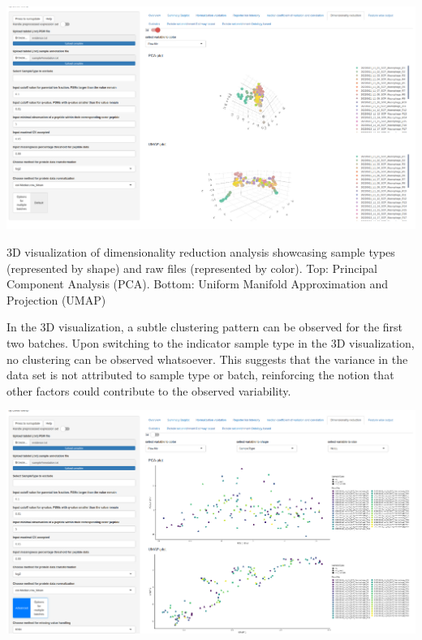 \documentclass[
  11pt,
]{article}
\let\origfigure\figure
\begin{document}
\newpage
\bgroup  \origfigure[H] 

{\centering \includegraphics[width=1\linewidth]{screenshots/dim_red_3d} 

}

\caption{3D visualization of dimensionality reduction analysis showcasing sample types (represented by shape) and raw files (represented by color). Top: Principal Component Analysis (PCA). Bottom: Uniform Manifold Approximation and Projection (UMAP)}\label{fig:ui_dim_red_c3d}
 \endfigure\egroup

In the 3D visualization, a subtle clustering pattern can be observed for
the first two batches. Upon switching to the indicator sample type in
the 3D visualization, no clustering can be observed whatsoever. This
suggests that the variance in the data set is not attributed to sample
type or batch, reinforcing the notion that other factors could
contribute to the observed variability.

\newpage
\bgroup  \origfigure[H] 

{\centering \includegraphics[width=1\linewidth]{screenshots/dim_red_batchC} 

}
\end{document}
